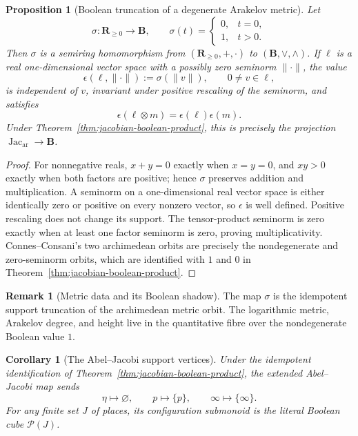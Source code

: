 \documentclass[11pt]{amsart}
\numberwithin{equation}{section}
\newtheorem{proposition}[theorem]{Proposition}
\newtheorem{corollary}[theorem]{Corollary}
\theoremstyle{definition}
\newtheorem{remark}[theorem]{Remark}
\newcommand{\B}{\mathbf B}
\newcommand{\R}{\mathbf R}
\newcommand{\Jacar}{\operatorname{Jac}_{\mathrm{ar}}}
\begin{document}
\begin{proposition}[Boolean truncation of a degenerate Arakelov metric]
\label{prop:arakelov-support-truncation}
Let
\[
\sigma:\R_{\geq0}\longrightarrow\B,
\qquad
\sigma(t)=
\begin{cases}
0,&t=0,\\
1,&t>0.
\end{cases}
\]
Then $\sigma$ is a semiring homomorphism from
$(\R_{\geq0},+,\cdot)$ to $(\B,\vee,\wedge)$.  If $\ell$ is a real
one-dimensional vector space with a possibly zero seminorm $\|\cdot\|$,
the value
\[
\epsilon(\ell,\|\cdot\|):=\sigma(\|v\|),
\qquad 0\neq v\in\ell,
\]
is independent of $v$, invariant under positive rescaling of the
seminorm, and satisfies
\[
\epsilon(\ell\otimes m)=\epsilon(\ell)\epsilon(m).
\]
Under Theorem~\ref{thm:jacobian-boolean-product}, this is precisely the
projection $\Jacar\to\B$.
\end{proposition}

\begin{proof}
For nonnegative reals, $x+y=0$ exactly when $x=y=0$, and $xy>0$ exactly
when both factors are positive; hence $\sigma$ preserves addition and
multiplication.  A seminorm on a one-dimensional real vector space is
either identically zero or positive on every nonzero vector, so
$\epsilon$ is well defined.  Positive rescaling does not change its
support.  The tensor-product seminorm is zero exactly when at least one
factor seminorm is zero, proving multiplicativity.  Connes--Consani's two
archimedean orbits are precisely the nondegenerate and zero-seminorm
orbits, which are identified with $1$ and $0$ in
Theorem~\ref{thm:jacobian-boolean-product}.
\end{proof}

\begin{remark}[Metric data and its Boolean shadow]
The map $\sigma$ is the idempotent support truncation of the archimedean
metric orbit.  The logarithmic metric, Arakelov degree, and height live in
the quantitative fibre over the nondegenerate Boolean value $1$.
\end{remark}

\begin{corollary}[The Abel--Jacobi support vertices]
\label{cor:abel-jacobi-support-vertices}
Under the idempotent identification of
Theorem~\ref{thm:jacobian-boolean-product}, the extended Abel--Jacobi map
sends
\[
\eta\longmapsto\varnothing,
\qquad
p\longmapsto\{p\},
\qquad
\infty\longmapsto\{\infty\}.
\]
For any finite set $J$ of places, its configuration submonoid is the
literal Boolean cube $\mathcal P(J)$.
\end{corollary}
\end{document}
